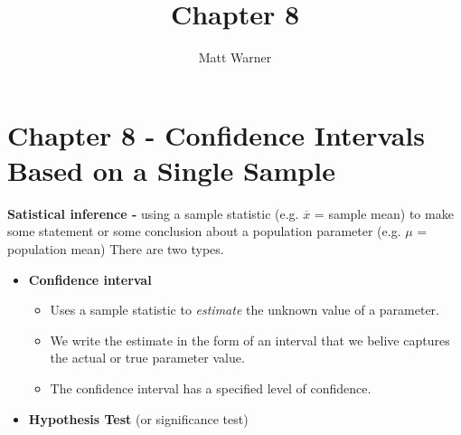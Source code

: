 \documentclass{report}
\title{\Huge{Chapter 8}}
\author{\huge{Matt Warner}}
\date{\huge{}}
\begin{document}
  \maketitle
  \section*{Chapter 8 - Confidence Intervals Based on a Single Sample}
    \textbf{Satistical inference - }using a sample statistic (e.g. $\overline{x}$ = sample mean) to make some statement or some conclusion about a population parameter (e.g. $\mu$ = population mean) There are two types.
    \begin{itemize}
      \item \textbf{Confidence interval} 
        \begin{itemize}[label=$\circ$]
          \item Uses a sample statistic to \textit{estimate} the unknown value of a parameter.
          \item We write the estimate in the form of an interval that we belive captures the actual or true parameter value.
          \item The confidence interval has a specified level of confidence.
        \end{itemize}
      \item \textbf{Hypothesis Test} (or significance test)
    \end{itemize}
    \bigbreak \noindent
\end{document}
